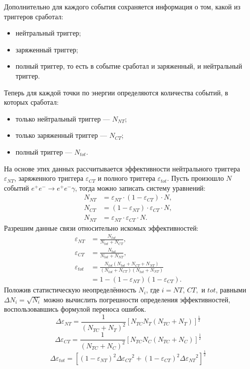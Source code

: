 Дополнительно для каждого события сохраняется информация о том,
какой из триггеров сработал:
\begin{itemize}
  \item нейтральный триггер;
  \item заряженный триггер;
  \item полный триггер, то есть в событие сработал и заряженный, и нейтральный триггер.
\end{itemize}
Теперь для каждой точки по энергии определяются количества событий, в которых сработал:
\begin{itemize}
  \item только нейтральный триггер --- $N_{NT}$;
  \item только заряженный триггер ---  $N_{CT}$;
  \item полный триггер --- $N_{tot}$.
\end{itemize}
На основе этих данных рассчитывается эффективности нейтрального триггера $\varepsilon_{NT}$,
заряженного триггера $\varepsilon_{CT}$ и полного триггера $\varepsilon_{tot}$.
Пусть произошло $N$ событий $e^+ e^- \to e^+ e^- \gamma$,
тогда можно записать систему уравнений:
\begin{align}
    N_{NT} &= \varepsilon_{NT} \cdot ( 1 - \varepsilon_{CT} ) \cdot N , \\
    N_{CT} &= ( 1 - \varepsilon_{NT} ) \cdot \varepsilon_{CT} \cdot N , \\
    N_{NT} &= \varepsilon_{NT} \cdot \varepsilon_{CT} \cdot N .
\end{align}
Разрешим данные связи относительно искомых эффективностей:
\begin{align}
    \varepsilon_{NT} &= \frac{ N_{tot} }{ N_{tot}+N_{CT} } , \\
    \varepsilon_{CT} &= \frac{ N_{tot} }{ N_{tot}+N_{NT} } , \\
    \varepsilon_{tot} &= 
    \frac{ N_{tot} (N_{tot}+N_{CT}+N_{NT}) }{
        (N_{tot}+N_{CT}) (N_{tot}+N_{NT})
    } \\
    &=
    1 - (1-\varepsilon_{NT}) (1-\varepsilon_{CT}) .
\end{align}
Положив статистическую неопределённость $N_i$,
где $i = NT, \, CT,$ и $tot$,
равными $ \Delta N_i  = \sqrt{N_i} $ можно вычислить погрешности определения эффективностей,
воспользовавшись формулой переноса ошибок.
\[ \Delta  \varepsilon_{NT} = \frac{1}{ ( N_{TC} + N_T )^2} \left[ N_{TC}  N_T ( N_{TC} + N_T )
\right]^\frac{1}{2} \]
\[ \Delta  \varepsilon_{CT} = \frac{1}{ ( N_{TC} + N_C )^2} \left[ N_{TC}  N_C ( N_{TC} + N_C )
\right]^\frac{1}{2} \]
\[ \Delta  \varepsilon_{tot} =  \left[ (1-\varepsilon_{NT})^2 {\Delta  \varepsilon_{CT}}^2 +
(1-\varepsilon_{CT})^2 {\Delta  \varepsilon_{NT}}^2 \right]^\frac{1}{2} \]

